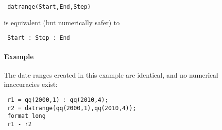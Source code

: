  \begin{verbatim}
 datrange(Start,End,Step)
 \end{verbatim}
 
 is equivalent (but numerically safer) to
 
 \begin{verbatim}
 Start : Step : End
 \end{verbatim}
 
 \paragraph{Example}
 
 The date ranges created in this example are identical, and no numerical
 inaccuracies exist:
 
 \begin{verbatim}
 r1 = qq(2000,1) : qq(2010,4);
 r2 = datrange(qq(2000,1),qq(2010,4));
 format long
 r1 - r2
 \end{verbatim}



